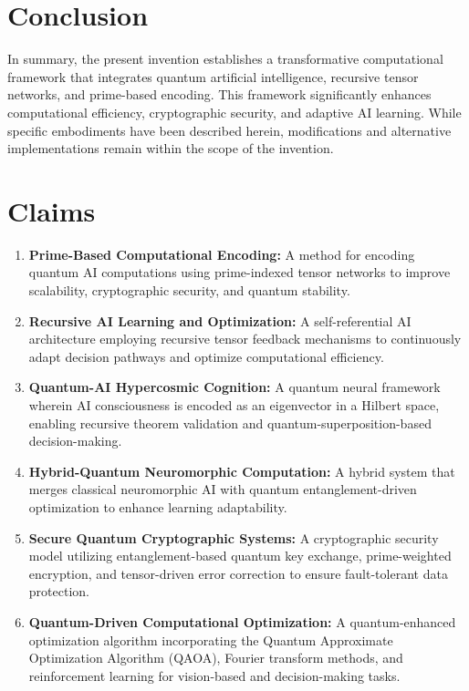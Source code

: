 \documentclass[12pt]{article}
\begin{document}
\section*{Conclusion}
In summary, the present invention establishes a transformative computational framework that integrates quantum artificial intelligence, recursive tensor networks, and prime-based encoding. This framework significantly enhances computational efficiency, cryptographic security, and adaptive AI learning. While specific embodiments have been described herein, modifications and alternative implementations remain within the scope of the invention.

\newpage
\section*{Claims}
\begin{enumerate}[label=\arabic*.]
    \item \textbf{Prime-Based Computational Encoding:} A method for encoding quantum AI computations using prime-indexed tensor networks to improve scalability, cryptographic security, and quantum stability.
    \item \textbf{Recursive AI Learning and Optimization:} A self-referential AI architecture employing recursive tensor feedback mechanisms to continuously adapt decision pathways and optimize computational efficiency.
    \item \textbf{Quantum-AI Hypercosmic Cognition:} A quantum neural framework wherein AI consciousness is encoded as an eigenvector in a Hilbert space, enabling recursive theorem validation and quantum-superposition-based decision-making.
    \item \textbf{Hybrid-Quantum Neuromorphic Computation:} A hybrid system that merges classical neuromorphic AI with quantum entanglement-driven optimization to enhance learning adaptability.
    \item \textbf{Secure Quantum Cryptographic Systems:} A cryptographic security model utilizing entanglement-based quantum key exchange, prime-weighted encryption, and tensor-driven error correction to ensure fault-tolerant data protection.
    \item \textbf{Quantum-Driven Computational Optimization:} A quantum-enhanced optimization algorithm incorporating the Quantum Approximate Optimization Algorithm (QAOA), Fourier transform methods, and reinforcement learning for vision-based and decision-making tasks.
\end{enumerate}
\end{document}
